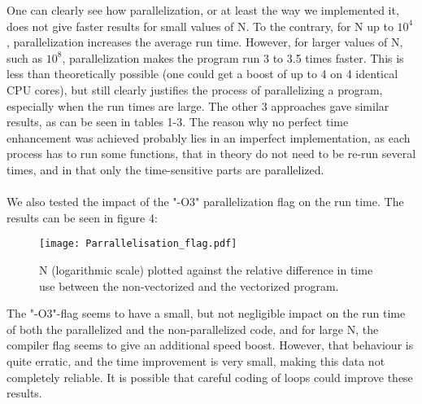 \documentclass[10pt,a4paper]{article}
\begin{document}
One can clearly see how parallelization, or at least the way we implemented it, does not give faster results for small values of N. To the contrary, for N up to $10^4$, parallelization increases the average run time. However, for larger values of N, such as $10^8$, parallelization makes the program run 3 to 3.5 times faster. This is less than theoretically possible (one could get a boost of up to 4 on 4 identical CPU cores), but still clearly justifies the process of parallelizing a program, especially when the run times are large. The other 3 approaches gave similar results, as can be seen in tables 1-3. The reason why no perfect time enhancement was achieved probably lies in an imperfect implementation, as each process has to run some functions, that in theory do not need to be re-run several times, and in that only the time-sensitive parts are parallelized.\\\\
We also tested the impact of the "-O3" parallelization flag on the run time. The results can be seen in figure 4:
\begin{figure}[H]
\centering
\texttt{[image: Parrallelisation\_flag.pdf]}
\caption[Vectorization flags]{N (logarithmic scale) plotted against the relative difference in time use between the non-vectorized and the vectorized program. }
\end{figure}
The "-O3"-flag seems to have a small, but not negligible impact on the run time of both the parallelized and the non-parallelized code, and for large N, the compiler flag seems to give an additional speed boost.
However, that behaviour is quite erratic, and the time improvement is very small, making this data not completely reliable. It is possible that careful coding of loops could improve these results.
\end{document}
